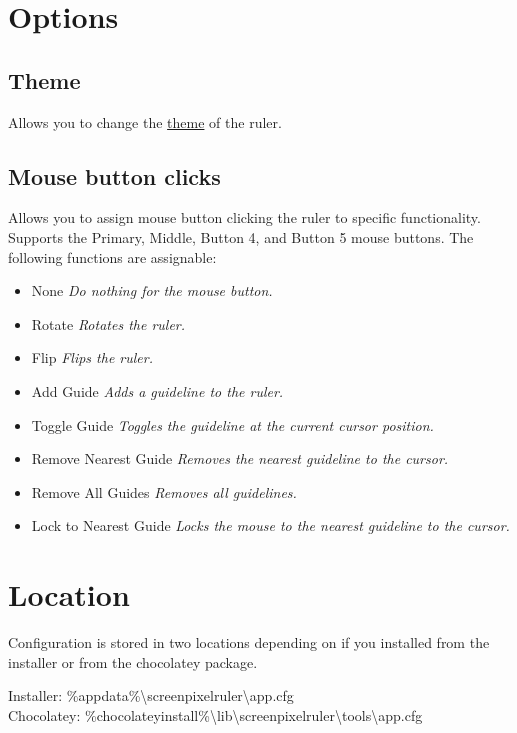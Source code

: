 \documentclass[
]{book}
\providecommand{\tightlist}{%
  \setlength{\itemsep}{0pt}\setlength{\parskip}{0pt}}
\begin{document}
\section{Options}\label{options}

\subsection{Theme}\label{theme}

Allows you to change the \hyperref[themes]{theme} of the ruler.

\subsection{Mouse button clicks}\label{mouse-button-clicks}

Allows you to assign mouse button clicking the ruler to specific functionality.
Supports the Primary, Middle, Button 4, and Button 5 mouse buttons.
The following functions are assignable:

\begin{itemize}
\tightlist
\item
  None \emph{Do nothing for the mouse button.}
\item
  Rotate \emph{Rotates the ruler.}
\item
  Flip \emph{Flips the ruler.}
\item
  Add Guide \emph{Adds a guideline to the ruler.}
\item
  Toggle Guide \emph{Toggles the guideline at the current cursor position.}
\item
  Remove Nearest Guide \emph{Removes the nearest guideline to the cursor.}
\item
  Remove All Guides \emph{Removes all guidelines.}
\item
  Lock to Nearest Guide \emph{Locks the mouse to the nearest guideline to the cursor.}
\end{itemize}

\section{Location}\label{location}

Configuration is stored in two locations depending on if you installed from the installer or from the chocolatey package.

Installer: \%appdata\%\textbackslash screenpixelruler\textbackslash app.cfg\\
Chocolatey: \%chocolateyinstall\%\textbackslash lib\textbackslash screenpixelruler\textbackslash tools\textbackslash app.cfg
\end{document}

